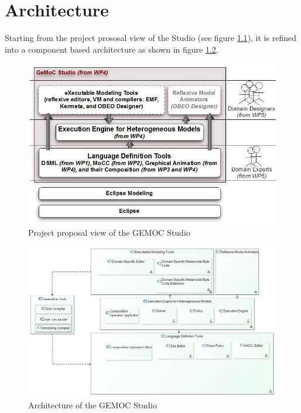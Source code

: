 \documentclass{gemoc} %
\begin{document}
\chapter{Architecture}
Starting from the project prososal view of the Studio (see figure \ref{fig:ProjectProposalView}), it is refined into a component based architecture as shown in figure \ref{fig:GlobalView}. 
\begin{figure}[htp]
	\begin{center}
	\includegraphics*[trim=0.0cm 0.0cm 0cm 0.0cm, clip=true, width=1.0\linewidth]{../images/ProjectProposalView.jpg}
	\caption{Project proposal view of the GEMOC Studio}
	\label{fig:ProjectProposalView}
	\end{center}
\end{figure}
\begin{figure}[htp]
	\begin{center}
	\includegraphics*[trim=0.0cm 0.0cm 0cm 0.0cm, clip=true, width=1.0\linewidth]{../images/Global View.jpg}
	\caption{Architecture of the GEMOC Studio}
	\label{fig:GlobalView}
	\end{center}
\end{figure}
\end{document}
